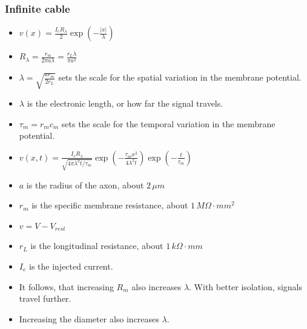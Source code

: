 \documentclass[a4paper, 12pt]{article}
\begin{document}
\subsubsection{Infinite cable}
\begin{figure}[H]
	\centering
\end{figure}
\begin{itemize}[noitemsep,nolistsep]
	\item $v(x) = \frac{I_eR_\lambda}{2}\exp(-\frac{|x|}{\lambda})$
	\item $R_\lambda=\frac{r_m}{2\pi a\lambda} = \frac{r_L\lambda}{\pi a^2}$
	\item $\lambda = \sqrt{\frac{ar_m}{2r_L}}$ sets the scale for the spatial variation in the membrane potential.
	\item $\lambda$ is the electronic length, or how far the signal travels.
	\item $\tau_m = r_mc_m$ sets the scale for the temporal variation in the membrane potential.
	\item $v(x,t) = \frac{I_eR_\lambda}{\sqrt{4\pi\lambda^2t/\tau_m}}\exp(-\frac{\tau_mx^2}{4\lambda^2t})\exp(-\frac{t}{\tau_m})$
	\item $a$ is the radius of the axon, about $2\,\mu m$
	\item $r_m$ is the specific membrane resistance, about $1\,M\Omega\cdot mm^2$
	\item $v = V - V_{rest}$
	\item $r_L$ is the longitudinal resistance, about $1\,k\Omega\cdot mm$
	\item $I_e$ is the injected current.
	\item It follows, that increasing $R_m$ also increases $\lambda$. With better isolation, signals travel further.
	\item Increasing the diameter also increases $\lambda$.
\end{itemize}
\end{document}
